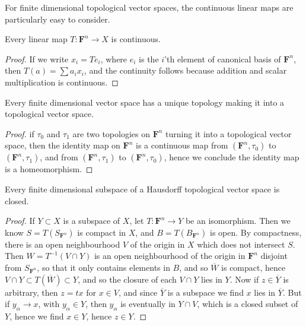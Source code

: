 For finite dimensional topological vector spaces, the continuous linear maps are particularly easy to consider.

\begin{lemma}
    Every linear map $T: \mathbf{F}^n \to X$ is continuous.
\end{lemma}
\begin{proof}
    If we write $x_i = Te_i$, where $e_i$ is the $i$'th element of canonical basis of $\mathbf{F}^n$, then $T(a) = \sum a_i x_i$, and the continuity follows because addition and scalar multiplication is continuous.
\end{proof}

\begin{corollary}
    Every finite dimensional vector space has a unique topology making it into a topological vector space.
\end{corollary}
\begin{proof}
    if $\tau_0$ and $\tau_1$ are two topologies on $\mathbf{F}^n$ turning it into a topological vector space, then the identity map on $\mathbf{F}^n$ is a continuous map from $(\mathbf{F}^n, \tau_0)$ to $(\mathbf{F}^n, \tau_1)$, and from $(\mathbf{F}^n, \tau_1)$ to $(\mathbf{F}^n, \tau_0)$, hence we conclude the identity map is a homeomorphism.
\end{proof}

\begin{corollary}
    Every finite dimensional subspace of a Hausdorff topological vector space is closed.
\end{corollary}
\begin{proof}
    If $Y \subset X$ is a subspace of $X$, let $T: \mathbf{F}^n \to Y$ be an isomorphism. Then we know $S = T(S_{\mathbf{F}^n})$ is compact in $X$, and $B = T(B_{\mathbf{F}^n})$ is open. By compactness, there is an open neighbourhood $V$ of the origin in $X$ which does not intersect $S$. Then $W = T^{-1}(V \cap Y)$ is an open neighbourhood of the origin in $\mathbf{F}^n$ disjoint from $S_{\mathbf{F}^n}$, so that it only contains elements in $B$, and so $\overline{W}$ is compact, hence $V \cap Y \subset T(\overline{W}) \subset Y$, and so the closure of each $V \cap Y$ lies in $Y$. Now if $z \in \overline{Y}$ is arbitrary, then $z = tx$ for $x \in V$, and since $\overline{Y}$ is a subspace we find $x$ lies in $\overline{Y}$. But if $y_\alpha \to x$, with $y_\alpha \in Y$, then $y_\alpha$ is eventually in $Y \cap V$, which is a closed subset of $Y$, hence we find $x \in Y$, hence $z \in Y$.
\end{proof}


